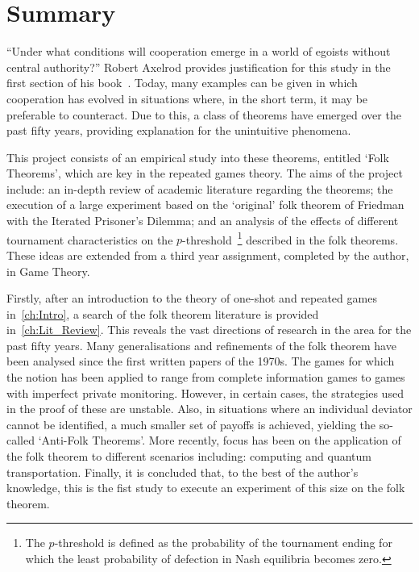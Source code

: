 \chapter{Summary}
``Under what conditions will cooperation emerge in a world of egoists without
central authority?'' Robert Axelrod provides justification for this study in
the first section of his book~\cite{Axelrod1984a}. Today, many examples can be
given in which cooperation has evolved in situations where, in the short term,
it may be preferable to counteract. Due to this, a class of theorems have
emerged over the past fifty years, providing explanation for the unintuitive
phenomena.

This project consists of an empirical study into these theorems, entitled
`Folk Theorems', which are key in the repeated games theory. The aims of
the project include: an in-depth review of academic literature regarding the
theorems; the execution of a large experiment based on the
`original' folk theorem of Friedman~\cite{Friedman1971} with the Iterated
Prisoner's Dilemma; and an analysis of the effects of different tournament
characteristics on the \(p\)-threshold~\footnote{The \(p\)-threshold is defined
as the probability of the tournament ending for which the
least probability of defection in Nash equilibria becomes zero.} described in the folk theorems. These
ideas are extended from a third year assignment, completed by the
author, in Game Theory.

Firstly, after an introduction to the theory of one-shot and repeated games in~\autoref{ch:Intro}, a
search of the folk theorem literature is provided in~\autoref{ch:Lit_Review}. This reveals the vast
directions of research in the area for the past fifty years. Many
generalisations and refinements of the folk theorem have been analysed since the
first written papers of the 1970s. The games for which the notion has been
applied to range from complete information games to games with imperfect
private monitoring. However, in certain cases, the strategies used in the proof
of these are unstable. Also, in situations where an individual deviator cannot
be identified, a much smaller set of payoffs is achieved, yielding the
so-called `Anti-Folk Theorems'. More recently, focus has been on the application
of the folk theorem to different scenarios including: computing and quantum transportation.
Finally, it is concluded that, to the best of the author's knowledge, this is
the fist study to execute an experiment of this size on the folk theorem.

